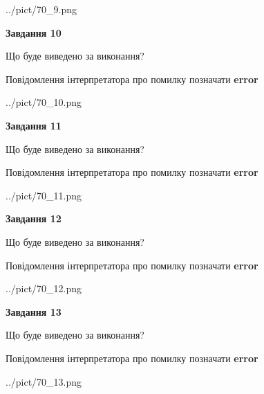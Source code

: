 \documentclass[11pt, ukrainian]{article}
\begin{document}
{\begin {large}
\begin{center}
	{../pict/70_9.png}
\end{center}
\newpage

{\begin {center}\textbf{Завдання 10}\end {center}}\par
Що буде виведено за виконання? \par
Повідомлення інтерпретатора про помилку позначати \textbf{error}

\begin{center}
	{../pict/70_10.png}
\end{center}
\newpage

{\begin {center}\textbf{Завдання 11}\end {center}}\par
Що буде виведено за виконання? \par
Повідомлення інтерпретатора про помилку позначати \textbf{error}

\begin{center}
	{../pict/70_11.png}
\end{center}
\newpage

{\begin {center}\textbf{Завдання 12}\end {center}}\par
Що буде виведено за виконання? \par
Повідомлення інтерпретатора про помилку позначати \textbf{error}

\begin{center}
	{../pict/70_12.png}
\end{center}
\newpage

{\begin {center}\textbf{Завдання 13}\end {center}}\par
Що буде виведено за виконання? \par
Повідомлення інтерпретатора про помилку позначати \textbf{error}

\begin{center}
	{../pict/70_13.png}
\end{center}
\newpage


\end{large}}
\end{document}
